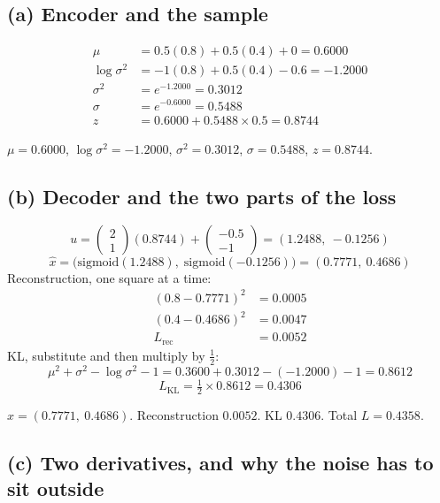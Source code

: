 \documentclass[11pt,a4paper]{article}
\begin{document}
\subsection{(a) Encoder and the sample}

\begin{align*}
\mu &= 0.5(0.8)+0.5(0.4)+0 = 0.6000\\
\log\sigma^2 &= -1(0.8)+0.5(0.4)-0.6 = -1.2000\\
\sigma^2 &= e^{-1.2000}=0.3012\\
\sigma &= e^{-0.6000}=0.5488\\
z &= 0.6000 + 0.5488\times 0.5 = 0.8744
\end{align*}

\begin{answer}[Q4(a)]
\(\mu=0.6000\), \(\log\sigma^2=-1.2000\), \(\sigma^2=0.3012\), \(\sigma=0.5488\), \(z=0.8744\).
\end{answer}

\subsection{(b) Decoder and the two parts of the loss}

\[
u = \begin{pmatrix}2\\1\end{pmatrix}(0.8744)+\begin{pmatrix}-0.5\\-1\end{pmatrix}
  = (1.2488,\ -0.1256)
\]
\[
\hat x = \big(\mathrm{sigmoid}(1.2488),\;\mathrm{sigmoid}(-0.1256)\big)
       = (0.7771,\ 0.4686)
\]
Reconstruction, one square at a time:
\begin{align*}
(0.8-0.7771)^2 &= 0.0005\\
(0.4-0.4686)^2 &= 0.0047\\
L_{\mathrm{rec}} &= 0.0052
\end{align*}
KL, substitute and then multiply by \(\tfrac12\):
\[
\mu^2+\sigma^2-\log\sigma^2-1
=0.3600+0.3012-(-1.2000)-1
=0.8612
\]
\[
L_{\mathrm{KL}}=\tfrac12\times 0.8612=0.4306
\]

\begin{answer}[Q4(b)]
\(\hat x=(0.7771,\ 0.4686)\). Reconstruction \(0.0052\). KL \(0.4306\). Total \(L=0.4358\).
\end{answer}

\subsection{(c) Two derivatives, and why the noise has to sit outside}
\end{document}

